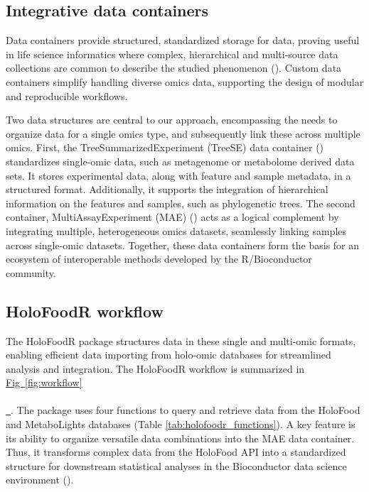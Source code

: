 \documentclass[unnumsec,webpdf,namedate,modern,large]{oup-authoring-template}%
\newcommand*{\figref}[2][]{%
  \hyperref[{fig:#2}]{%
    Fig~\ref*{fig:#2}%
    \ifx\\#1\\%
    \else
      \,#1%
    \fi
  }%
}
\begin{document}
\vspace{-1em}
\subsection{Integrative data containers}

Data containers provide structured, standardized storage for data, proving useful in life science informatics where complex, hierarchical and multi-source data collections are common to describe the studied phenomenon (\cite{drnevich_2024}). Custom data containers simplify handling diverse omics data, supporting the design of modular and reproducible workflows.

Two data structures are central to our approach, encompassing the needs to organize data for a single omics type, and subsequently link these across multiple omics.
First, the TreeSummarizedExperiment (TreeSE) data container (\cite{huang_treesummarizedexperiment_2021}) standardizes single-omic data, such as metagenome or metabolome derived data sets. It stores experimental data, along with feature and sample metadata, in a structured format. Additionally, it supports the integration of hierarchical information on the features and samples, such as phylogenetic trees. The second container, MultiAssayExperiment (MAE) (\cite{ramos_software_2017}) acts as a logical complement by integrating multiple, heterogeneous omics datasets, seamlessly linking samples across single-omic datasets. Together, these data containers form the basis for an ecosystem of interoperable methods developed by the R/Bioconductor community.

\vspace{-1em}
\subsection{HoloFoodR workflow}

The HoloFoodR package structures data in these single and multi-omic formats, enabling efficient data importing from holo-omic databases for streamlined analysis and integration. The HoloFoodR workflow is summarized in \figref{workflow}. The package uses four functions to query and retrieve data from the HoloFood and MetaboLights databases (Table \ref{tab:holofoodr_functions}). A key feature is its ability to organize versatile data combinations into the MAE data container. Thus, it transforms complex data from the HoloFood API into a standardized structure for downstream statistical analyses in the Bioconductor data science environment  (\cite{ramos_software_2017}).
\end{document}
